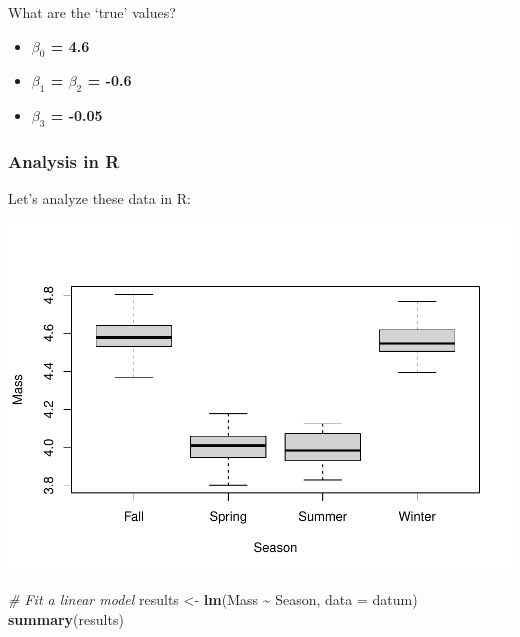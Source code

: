 \documentclass[
]{article}
\newenvironment{Shaded}{\begin{snugshade}}{\end{snugshade}}
\newcommand{\AttributeTok}[1]{\textcolor[rgb]{0.13,0.29,0.53}{#1}}
\newcommand{\CommentTok}[1]{\textcolor[rgb]{0.56,0.35,0.01}{\textit{#1}}}
\newcommand{\FunctionTok}[1]{\textcolor[rgb]{0.13,0.29,0.53}{\textbf{#1}}}
\newcommand{\NormalTok}[1]{#1}
\newcommand{\OtherTok}[1]{\textcolor[rgb]{0.56,0.35,0.01}{#1}}
\newcommand{\SpecialCharTok}[1]{\textcolor[rgb]{0.81,0.36,0.00}{\textbf{#1}}}
\providecommand{\tightlist}{%
  \setlength{\itemsep}{0pt}\setlength{\parskip}{0pt}}
\begin{document}
What are the `true' values?

\begin{itemize}
\tightlist
\item
  \textbf{\(\beta_0\) = 4.6}
\item
  \textbf{\(\beta_1\) = \(\beta_2\) = -0.6}
\item
  \textbf{\(\beta_3\) = -0.05}
\end{itemize}

\subsubsection{Analysis in R}\label{analysis-in-r}

Let's analyze these data in R:

\begin{Shaded}
\end{Shaded}

\includegraphics{lecture_10_files/figure-latex/seasons-2-1.pdf}

\begin{Shaded}
\begin{Highlighting}[]
\CommentTok{\# Fit a linear model}
\NormalTok{results }\OtherTok{\textless{}{-}} \FunctionTok{lm}\NormalTok{(Mass }\SpecialCharTok{\textasciitilde{}}\NormalTok{ Season, }\AttributeTok{data =}\NormalTok{ datum)}
\FunctionTok{summary}\NormalTok{(results)}
\end{Highlighting}
\end{Shaded}
\end{document}

